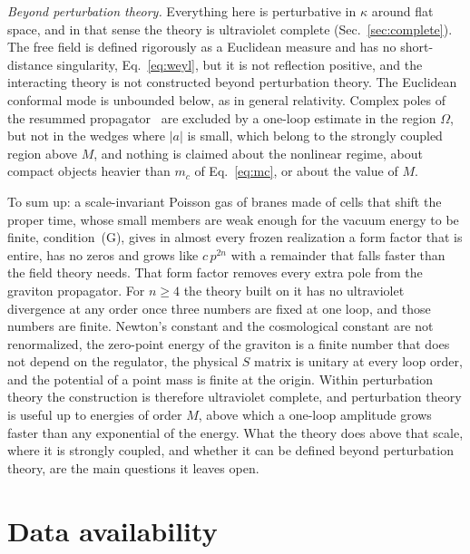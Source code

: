 \documentclass[aps,prd,10pt,twocolumn,superscriptaddress,nofootinbib,floatfix,longbibliography]{revtex4-2}
\begin{document}
\textit{Beyond perturbation theory.} Everything here is perturbative in $\kappa$ around flat space, and in that sense the theory is ultraviolet complete (Sec.~\ref{sec:complete}). The free field is defined rigorously as a Euclidean measure and has no short-distance singularity, Eq.~\eqref{eq:weyl}, but it is not reflection positive, and the interacting theory is not constructed beyond perturbation theory. The Euclidean conformal mode is unbounded below, as in general relativity. Complex poles of the resummed propagator~\cite{Shapiro2015} are excluded by a one-loop estimate in the region $\Omega$, but not in the wedges where $|a|$ is small, which belong to the strongly coupled region above $M$, and nothing is claimed about the nonlinear regime, about compact objects heavier than $m_c$ of Eq.~\eqref{eq:mc}, or about the value of $M$.

To sum up: a scale-invariant Poisson gas of branes made of cells that shift the proper time, whose small members are weak enough for the vacuum energy to be finite, condition~(G), gives in almost every frozen realization a form factor that is entire, has no zeros and grows like $c\,p^{2n}$ with a remainder that falls faster than the field theory needs. That form factor removes every extra pole from the graviton propagator. For $n\ge4$ the theory built on it has no ultraviolet divergence at any order once three numbers are fixed at one loop, and those numbers are finite. Newton's constant and the cosmological constant are not renormalized, the zero-point energy of the graviton is a finite number that does not depend on the regulator, the physical $S$ matrix is unitary at every loop order, and the potential of a point mass is finite at the origin. Within perturbation theory the construction is therefore ultraviolet complete, and perturbation theory is useful up to energies of order $M$, above which a one-loop amplitude grows faster than any exponential of the energy. What the theory does above that scale, where it is strongly coupled, and whether it can be defined beyond perturbation theory, are the main questions it leaves open.

\section*{Data availability}
\end{document}
